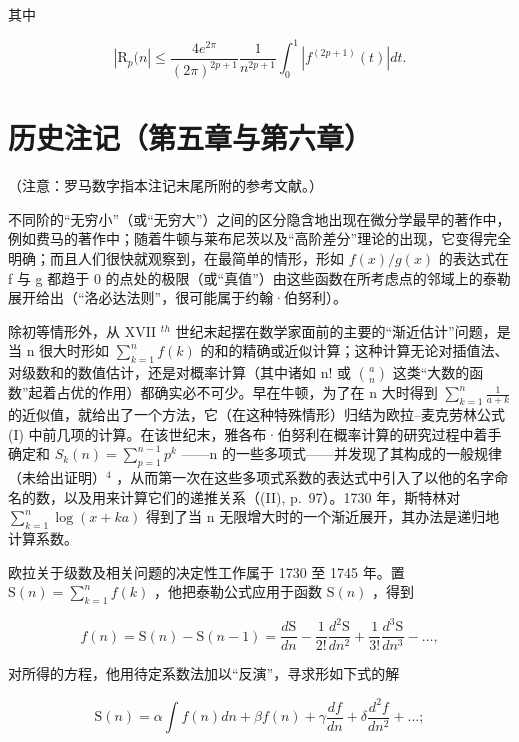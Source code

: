 其中

\[
\left| \mathrm{R} _ {p} (n \right| \leqslant \frac {4 e ^ {2 \pi}}{(2 \pi) ^ {2 p + 1}} \frac {1}{n ^ {2 p + 1}} \int_ {0} ^ {1} \left| f ^ {(2 p + 1)} (t) \right| d t.
\]

\section*{历史注记（第五章与第六章）}
{}

（注意：罗马数字指本注记末尾所附的参考文献。）

不同阶的“无穷小”（或“无穷大”）之间的区分隐含地出现在微分学最早的著作中，例如费马的著作中；随着牛顿与莱布尼茨以及“高阶差分”理论的出现，它变得完全明确；而且人们很快就观察到，在最简单的情形，形如 \(f(x)/g(x)\) 的表达式在 f 与 g 都趋于 0 的点处的极限（或“真值”）由这些函数在所考虑点的邻域上的泰勒展开给出（“洛必达法则”，很可能属于约翰·伯努利）。

除初等情形外，从 XVII \(^{th}\) 世纪末起摆在数学家面前的主要的“渐近估计”问题，是当 n 很大时形如 \(\sum_{k=1}^{n} f(k)\) 的和的精确或近似计算；这种计算无论对插值法、对级数和的数值估计，还是对概率计算（其中诸如 n! 或 \(\binom{a}{n}\) 这类“大数的函数”起着占优的作用）都确实必不可少。早在牛顿，为了在 n 大时得到 \(\sum_{k=1}^{n} \frac{1}{a+k}\) 的近似值，就给出了一个方法，它（在这种特殊情形）归结为欧拉–麦克劳林公式 (I) 中前几项的计算。在该世纪末，雅各布·伯努利在概率计算的研究过程中着手确定和 \(S_{k}(n) = \sum_{p=1}^{n-1} p^{k}\) ——n 的一些多项式——并发现了其构成的一般规律（未给出证明）\(^{4}\) ，从而第一次在这些多项式系数的表达式中引入了以他的名字命名的数，以及用来计算它们的递推关系（(II), p.~97）。1730 年，斯特林对 \(\sum_{k=1}^{n} \log(x + ka)\) 得到了当 n 无限增大时的一个渐近展开，其办法是递归地计算系数。

欧拉关于级数及相关问题的决定性工作属于 1730 至 1745 年。置 \(\mathrm{S}(n) = \sum_{k=1}^{n} f(k)\) ，他把泰勒公式应用于函数 \(\mathrm{S}(n)\) ，得到

\[
f (n) = \mathrm{S} (n) - \mathrm{S} (n - 1) = \frac {d \mathrm{S}}{d n} - \frac {1}{2 !} \frac {d ^ {2} \mathrm{S}}{d n ^ {2}} + \frac {1}{3 !} \frac {d ^ {3} \mathrm{S}}{d n ^ {3}} - \dots ,
\]

对所得的方程，他用待定系数法加以“反演”，寻求形如下式的解

\[
\mathrm{S} (n) = \alpha \int f (n) d n + \beta f (n) + \gamma \frac {d f}{d n} + \delta \frac {d ^ {2} f}{d n ^ {2}} + \dots ;
\]

